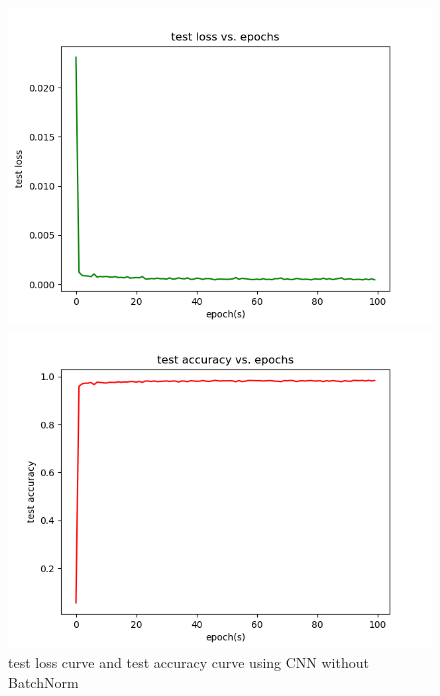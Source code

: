 \documentclass{elegantbook}
\begin{document}
\begin{figure}[!h]
	\centering
	\begin{minipage}[t]{0.48\textwidth}
		\centering
		\includegraphics[width=\textwidth]{../results/testloss22}
	\end{minipage}
	\begin{minipage}[t]{0.48\textwidth}
		\centering
		\includegraphics[width=\textwidth]{../results/testacc22}
	\end{minipage}
	\caption{\label{testres22}test loss curve and test accuracy curve using CNN without BatchNorm}
\end{figure}
\end{document}

